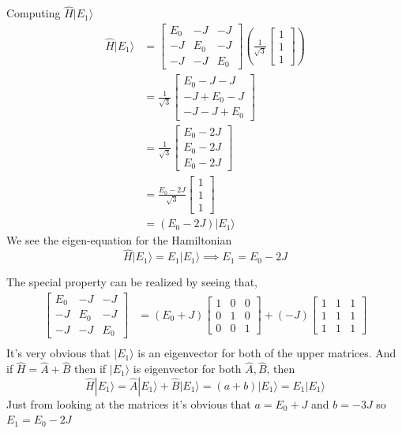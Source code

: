 \documentclass[letter]{article}
\begin{document}
Computing $\hat{H} | E_1 \rangle $
\begin{align*}
	\hat{H} | E_1 \rangle  &=  
	\begin{bmatrix} E_0&-J&-J\\-J&E_0&-J\\-J&-J&E_0 \end{bmatrix} 
	\left(
\frac{1}{\sqrt{3} } \begin{bmatrix} 1\\1\\1 \end{bmatrix} 
	\right)
	\\
	&= 
\frac{1}{\sqrt{3} } 
\begin{bmatrix} E_0 - J - J \\ -J + E_0 - J \\ - J - J + E_0  \end{bmatrix} 
	\\
	&= 
\frac{1}{\sqrt{3} } 
\begin{bmatrix} E_0 - 2J \\ E_0 - 2 J \\ E_0 - 2J  \end{bmatrix} 
	\\ 
	&= \frac{E_0 - 2J}{\sqrt{3} } \begin{bmatrix} 1\\1\\1 \end{bmatrix}  \\
	&= \left(E_0 - 2J\right) | E_1 \rangle  
\end{align*}
We see the eigen-equation for the Hamiltonian 
\[
\hat{H} | E_1 \rangle  = E_1 | E_1 \rangle  \implies E_1 = E_0 - 2J
\] 


The special property can be realized by seeing that,
\begin{align*}
	\begin{bmatrix} E_0&-J&-J\\-J&E_0&-J\\-J&-J&E_0 \end{bmatrix}  &= 
	(E_0 + J)\begin{bmatrix}  1 &0&0\\0&1&0\\0&0&1 \end{bmatrix}  + 
	(-J) \begin{bmatrix} 1&1&1\\1&1&1\\1&1&1 \end{bmatrix} 
	\\
\end{align*}
It's very obvious that $| E_1 \rangle $ is an eigenvector for both of the upper matrices. And if $\hat{H} = \hat{A} + \hat{B}$ then if $| E_1 \rangle $ is eigenvector for both $\hat{A},\hat{B}$, then 
\[ \hat{H} | E_1 \rangle =
\hat{A} | E_1 \rangle + \hat{B} | E_1 \rangle  = (a+b)| E_1 \rangle = E_1 | E_1 \rangle 
\]
Just from looking at the matrices it's obvious that $a = E_0+J$ and $b = -3J$ so $E_1 = E_0 - 2J$
\end{document}
